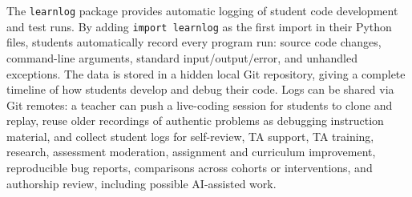 The \texttt{learnlog} package provides automatic logging of student code
development and test runs.
By adding \texttt{import learnlog} as the first import in their
Python files, students automatically record every program run: source code
changes, command-line arguments, standard input/output/error, and unhandled
exceptions.
The data is stored in a hidden local Git repository, giving a complete
timeline of how students develop and debug their code.
Logs can be shared via Git remotes: a teacher can push a live-coding
session for students to clone and replay, reuse older recordings of
authentic problems as debugging instruction material, and collect
student logs for self-review, TA support, TA training, research,
assessment moderation, assignment and curriculum improvement,
reproducible bug reports, comparisons across cohorts or
interventions, and authorship review, including possible
AI-assisted work.
